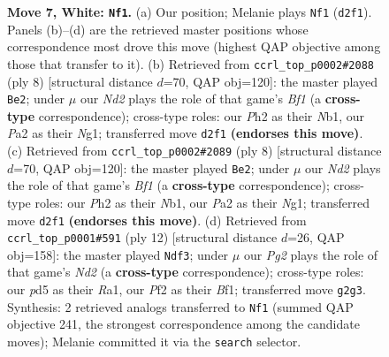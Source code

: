 \documentclass[11pt]{article}
\begin{document}
\begin{figure}[p]
\caption{\textbf{Move 7, White: \texttt{Nf1}.} (a) Our position; Melanie plays \texttt{Nf1} (\texttt{d2f1}). Panels (b)--(d) are the retrieved master positions whose correspondence most drove this move (highest QAP objective among those that transfer to it). (b) Retrieved from \texttt{ccrl\_top\_p0002\#2088} (ply 8) [structural distance $d$=70, QAP obj=120]: the master played \texttt{Be2}; under $\mu$ our \emph{Nd2} plays the role of that game's \emph{Bf1} (a \textbf{cross-type} correspondence); cross-type roles: our \emph{P}h2 as their \emph{N}b1, our \emph{P}a2 as their \emph{N}g1; transferred move \texttt{d2f1} \textbf{(endorses this move)}. (c) Retrieved from \texttt{ccrl\_top\_p0002\#2089} (ply 8) [structural distance $d$=70, QAP obj=120]: the master played \texttt{Be2}; under $\mu$ our \emph{Nd2} plays the role of that game's \emph{Bf1} (a \textbf{cross-type} correspondence); cross-type roles: our \emph{P}h2 as their \emph{N}b1, our \emph{P}a2 as their \emph{N}g1; transferred move \texttt{d2f1} \textbf{(endorses this move)}. (d) Retrieved from \texttt{ccrl\_top\_p0001\#591} (ply 12) [structural distance $d$=26, QAP obj=158]: the master played \texttt{Ndf3}; under $\mu$ our \emph{Pg2} plays the role of that game's \emph{Nd2} (a \textbf{cross-type} correspondence); cross-type roles: our \emph{p}d5 as their \emph{R}a1, our \emph{P}f2 as their \emph{B}f1; transferred move \texttt{g2g3}. Synthesis: 2 retrieved analogs transferred to \texttt{Nf1} (summed QAP objective 241, the strongest correspondence among the candidate moves); Melanie committed it via the \texttt{search} selector.}
\label{fig:thought-m12}
\end{figure}

\clearpage
\end{document}
